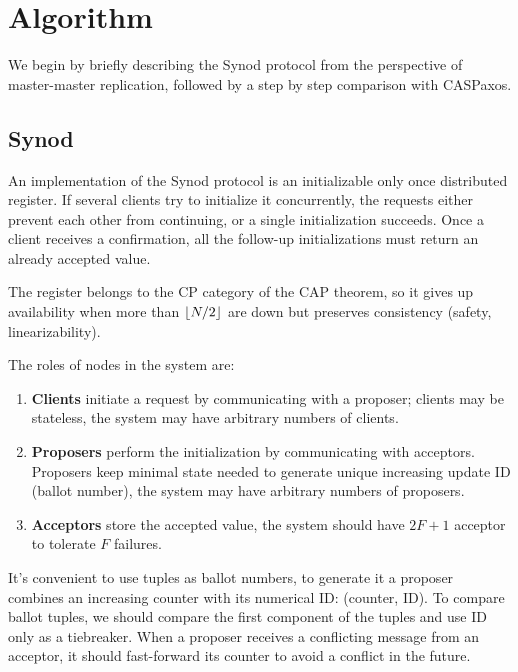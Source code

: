 \documentclass[12pt]{article}
\theoremstyle{definition}
\DeclarePairedDelimiter{\floor}{\lfloor}{\rfloor}
\begin{document}
\section{Algorithm}

We begin by briefly describing the Synod protocol from the perspective of master-master replication, followed by a step by step comparison with CASPaxos.

\subsection{Synod}

An implementation of the Synod protocol is an initializable only once distributed register. If several clients try to initialize it concurrently, the requests either prevent each other from continuing, or a single initialization succeeds. Once a client receives a confirmation, all the follow-up initializations must return an already accepted value.

The register belongs to the CP category of the CAP theorem, so it gives up availability when more than $\floor{N/2}$ are down but preserves consistency (safety, linearizability).

The roles of nodes in the system are:
\begin{enumerate}
  \item {\bf Clients} initiate a request by communicating with a proposer; clients may be stateless, the system may have arbitrary numbers of clients.
  \item {\bf Proposers} perform the initialization by communicating with acceptors. Proposers keep minimal state needed to generate unique increasing update ID (ballot number), the system may have arbitrary numbers of proposers.
  \item {\bf Acceptors} store the accepted value, the system should have $2F+1$ acceptor to tolerate $F$ failures.
\end{enumerate}

It's convenient to use tuples as ballot numbers, to generate it a proposer combines an increasing counter with its numerical ID: (counter, ID). To compare ballot tuples, we should compare the first component of the tuples and use ID only as a tiebreaker. When a proposer receives a conflicting message from an acceptor, it should fast-forward its counter to avoid a conflict in the future.
\end{document}
